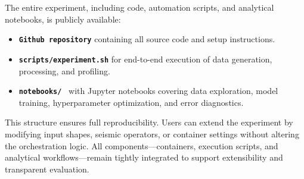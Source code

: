 The entire experiment, including code, automation scripts, and analytical notebooks, is publicly available:
\begin{itemize}
    \item \textbf{\texttt{Github repository}}\cite{delucca2025experiment2} containing all source code and setup instructions.
    \item \textbf{\texttt{scripts/experiment.sh}}\cite{delucca2025experiment2script} for end-to-end execution of data generation, processing, and profiling.
    \item \textbf{\texttt{notebooks/}}~\cite{delucca2025experiment2notebooks} with Jupyter notebooks covering data exploration, model training, hyperparameter optimization, and error diagnostics.
\end{itemize}

This structure ensures full reproducibility.
Users can extend the experiment by modifying input shapes, seismic operators, or container settings without altering the orchestration logic.
All components—containers, execution scripts, and analytical workflows—remain tightly integrated to support extensibility and transparent evaluation.